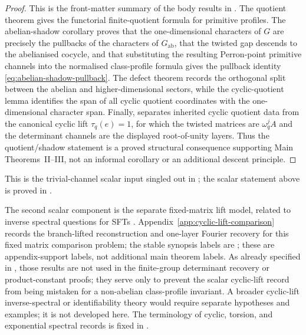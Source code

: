 \begin{proof}
This is the front-matter summary of the body results in
  .  The quotient theorem
  gives the functorial finite-quotient formula for primitive profiles.  The
  abelian-shadow corollary proves that the one-dimensional characters of
  \(G\) are precisely the pullbacks of the characters of
  \(G_{\mathrm{ab}}\), that the twisted gap descends to the abelianised
  cocycle, and that substituting the resulting Perron-point primitive
  channels into the normalised class-profile formula gives the pullback
  identity \eqref{eq:abelian-shadow-pullback}.  The defect theorem records
  the orthogonal split between the abelian and higher-dimensional sectors,
  while the cyclic-quotient lemma identifies the span of all cyclic quotient
  coordinates with the one-dimensional character span.  Finally,
   separates inherited cyclic
  quotient data from the canonical cyclic lift \(\tau_q(e)=1\), for which
  the twisted matrices are \(\omega_q^j A\) and the determinant channels are
  the displayed root-of-unity layers.  Thus the quotient/shadow statement is
a proved structural consequence supporting Main Theorems~II--III, not
  an informal corollary or an additional descent principle.
\end{proof}


This is the trivial-channel scalar input singled out in
;
  the scalar statement above is proved in
.

The second scalar component is the separate fixed-matrix lift model,
related to inverse spectral questions for SFTs
\cite{LindMarcus1995}. Appendix~\ref{app:cyclic-lift-comparison} records the
branch-lifted reconstruction and one-layer Fourier recovery for this fixed
matrix comparison problem; the stable synopsis labels are
;
these are appendix-support labels, not additional main theorem labels.
As already specified in
, those results are not used in the
finite-group determinant recovery or product-constant proofs; they serve
only to prevent the scalar cyclic-lift record from being mistaken for a
non-abelian class-profile invariant.  A broader cyclic-lift inverse-spectral
or identifiability theory would require separate hypotheses and examples;
it is not developed here.  The terminology of cyclic, torsion,
and exponential spectral records is fixed in
.

